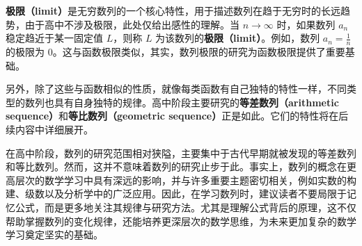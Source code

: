 \textbf{极限（limit）}是无穷数列的一个核心特性，用于描述数列在趋于无穷时的长远趋势，由于高中不涉及极限，此处仅给出感性的理解。当 $n \to \infty$ 时，如果数列 ${a_n}$ 稳定趋近于某一固定值 $L$，则称 $L$ 为该数列的\textbf{极限（limit）}。例如，数列 $a_n = \frac{1}{n}$ 的极限为 $0$。这与函数极限类似，其实，数列极限的研究为函数极限提供了重要基础。

另外，除了这些与函数相似的性质，就像每类函数有自己独特的特性一样，不同类型的数列也具有自身独特的规律。高中阶段主要研究的\textbf{等差数列（arithmetic sequence）}和\textbf{等比数列（geometric sequence）}正是如此。它们的特性将在后续内容中详细展开。

在高中阶段，数列的研究范围相对狭隘，主要集中于古代早期就被发现的等差数列和等比数列。然而，这并不意味着数列的研究止步于此。事实上，数列的概念在更高层次的数学学习中具有深远的影响，并与许多重要主题密切相关，例如实数的构建、级数以及分析学中的广泛应用。因此，在学习数列时，建议读者不要局限于记忆公式，而是更多地关注其规律与研究方法。尤其是理解公式背后的原理，这不仅帮助掌握数列的变化规律，还能培养更深层次的数学思维，为未来更加复杂的数学学习奠定坚实的基础。